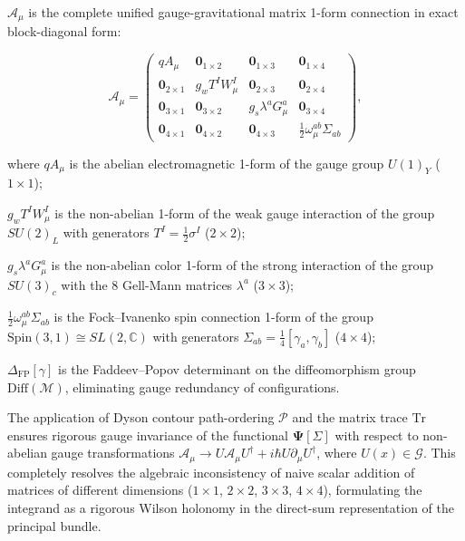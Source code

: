 \documentclass[11pt,a4paper]{article}
\theoremstyle{definition}
\begin{document}
$\mathbf{\mathcal{A}}_\mu$ is the complete unified gauge-gravitational matrix 1-form connection in exact block-diagonal form:

\begin{equation}\label{eq:1.28}\tag{1.28}
\mathbf{\mathcal{A}}_\mu = \begin{pmatrix} 
q A_\mu & \mathbf{0}_{1\times 2} & \mathbf{0}_{1\times 3} & \mathbf{0}_{1\times 4} \\ 
\mathbf{0}_{2\times 1} & g_w T^I W_\mu^I & \mathbf{0}_{2\times 3} & \mathbf{0}_{2\times 4} \\ 
\mathbf{0}_{3\times 1} & \mathbf{0}_{3\times 2} & g_s \lambda^a G_\mu^a & \mathbf{0}_{3\times 4} \\ 
\mathbf{0}_{4\times 1} & \mathbf{0}_{4\times 2} & \mathbf{0}_{4\times 3} & \frac{1}{2}\omega_\mu^{ab}\Sigma_{ab} 
\end{pmatrix},
\end{equation}

where $q A_\mu$ is the abelian electromagnetic 1-form of the gauge group $U(1)_Y$ ($1 \times 1$);  

$g_w T^I W_\mu^I$ is the non-abelian 1-form of the weak gauge interaction of the group $SU(2)_L$ with generators $T^I = \frac{1}{2}\sigma^I$ ($2 \times 2$);  

$g_s \lambda^a G_\mu^a$ is the non-abelian color 1-form of the strong interaction of the group $SU(3)_c$ with the 8 Gell-Mann matrices $\lambda^a$ ($3 \times 3$);  

$\frac{1}{2}\omega_\mu^{ab}\Sigma_{ab}$ is the Fock--Ivanenko spin connection 1-form of the group $\text{Spin}(3,1) \cong SL(2, \mathbb{C})$ with generators $\Sigma_{ab} = \frac{1}{4}[\gamma_a, \gamma_b]$ ($4 \times 4$);  

$\Delta_{\text{FP}}[\gamma]$ is the Faddeev--Popov determinant on the diffeomorphism group $\text{Diff}(\mathcal{M})$, eliminating gauge redundancy of configurations.

The application of Dyson contour path-ordering $\mathcal{P}$ and the matrix trace $\text{Tr}$ ensures rigorous gauge invariance of the functional $\mathbf{\Psi}[\Sigma]$ with respect to non-abelian gauge transformations $\mathbf{\mathcal{A}}_\mu \to U \mathbf{\mathcal{A}}_\mu U^\dagger + i\hbar U \partial_\mu U^\dagger$, where $U(x) \in \mathcal{G}$. This completely resolves the algebraic inconsistency of naive scalar addition of matrices of different dimensions ($1\times 1$, $2\times 2$, $3\times 3$, $4\times 4$), formulating the integrand as a rigorous Wilson holonomy in the direct-sum representation of the principal bundle.
\end{document}
